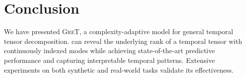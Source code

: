 \section{Conclusion}
We have presented \textsc{GreT},  a complexity-adaptive model for general temporal tensor decomposition.
\MODEL  can reveal the underlying rank of a temporal tensor with continuously indexed modes while achieving state-of-the-art predictive performance and capturing interpretable temporal patterns.
Extensive experiments on both synthetic and real-world tasks validate its effectiveness.





